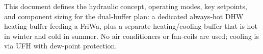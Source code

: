 \markdownRendererDocumentBegin
\markdownRendererSectionBegin
{}\markdownRendererInterblockSeparator
{}This document defines the hydraulic concept, operating modes, key setpoints, and component sizing for the dual‑buffer plan: a dedicated always‑hot DHW heating buffer feeding a FriWa, plus a separate heating/cooling buffer that is hot in winter and cold in summer. No air conditioners or fan‑coils are used; cooling is via UFH with dew‑point protection.\markdownRendererInterblockSeparator
{}\markdownRendererSectionBegin
{}
\markdownRendererSectionEnd 
\markdownRendererSectionEnd \markdownRendererDocumentEnd